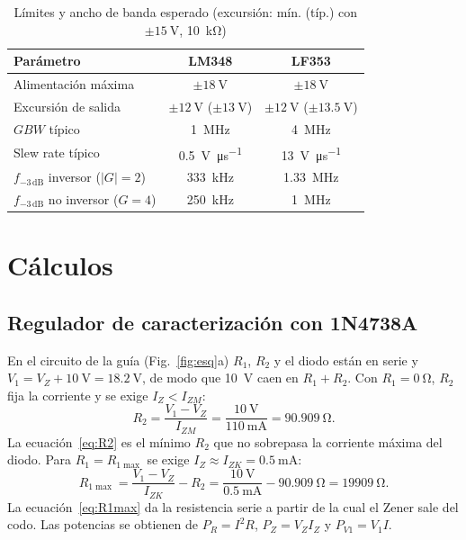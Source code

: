 \documentclass[9pt, conference]{IEEEtran}
\newcommand{\qV}[1]{\SI{#1}{\volt}}
\newcommand{\qmA}[1]{\SI{#1}{\milli\ampere}}
\newcommand{\qohm}[1]{\SI{#1}{\ohm}}
\newcommand{\qkohm}[1]{\SI{#1}{\kilo\ohm}}
\begin{document}
\begin{table}[htbp]
\caption{Límites y ancho de banda esperado (excursión: mín. (típ.) con $\pm\qV{15}$, \qkohm{10})}
\label{tab:opamp_ds}
\centering
\footnotesize
\setlength{\tabcolsep}{4pt}
\begin{tabular}{lcc}
\toprule
Parámetro & LM348 \cite{lm348} & LF353 \cite{lf353} \\
\midrule
Alimentación máxima & $\pm\qV{18}$ & $\pm\qV{18}$ \\
Excursión de salida & $\pm\qV{12}$ ($\pm\qV{13}$) & $\pm\qV{12}$ ($\pm\qV{13.5}$) \\
$GBW$ típico & \SI{1}{\mega\hertz} & \SI{4}{\mega\hertz} \\
Slew rate típico & \SI{0.5}{\volt\per\micro\second} & \SI{13}{\volt\per\micro\second} \\
$f_{-3\,\mathrm{dB}}$ inversor ($|G|=2$) & \SI{333}{\kilo\hertz} & \SI{1.33}{\mega\hertz} \\
$f_{-3\,\mathrm{dB}}$ no inversor ($G=4$) & \SI{250}{\kilo\hertz} & \SI{1}{\mega\hertz} \\
\bottomrule
\end{tabular}
\end{table}

\section{Cálculos}

\subsection{Regulador de caracterización con 1N4738A}
En el circuito de la guía (Fig.~\ref{fig:esq}a) $R_1$, $R_2$ y el diodo están en serie y $V_1=V_Z+\qV{10}=\qV{18.2}$, de modo que \qV{10} caen en $R_1+R_2$. Con $R_1=\qohm{0}$, $R_2$ fija la corriente y se exige $I_Z<I_{ZM}$:
\begin{equation}
R_2=\frac{V_1-V_Z}{I_{ZM}}=\frac{\qV{10}}{\qmA{110}}=\qohm{90.909}.
\label{eq:R2}
\end{equation}
La ecuación~\eqref{eq:R2} es el mínimo $R_2$ que no sobrepasa la corriente máxima del diodo. Para $R_1=R_{1\max}$ se exige $I_Z\approx I_{ZK}=\qmA{0.5}$:
\begin{equation}
R_{1\max}=\frac{V_1-V_Z}{I_{ZK}}-R_2=\frac{\qV{10}}{\qmA{0.5}}-\qohm{90.909}=\qohm{19909}.
\label{eq:R1max}
\end{equation}
La ecuación~\eqref{eq:R1max} da la resistencia serie a partir de la cual el Zener sale del codo. Las potencias se obtienen de $P_R=I^{2}R$, $P_Z=V_ZI_Z$ y $P_{V1}=V_1I$.
\end{document}
